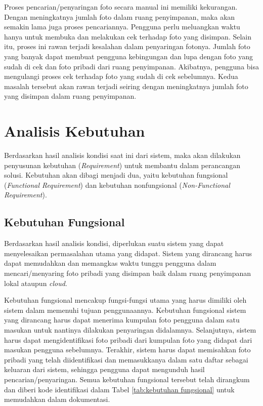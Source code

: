 Proses pencarian/penyaringan foto secara manual ini memiliki kekurangan. Dengan meningkatnya jumlah foto dalam ruang penyimpanan, maka akan semakin lama juga proses pencariannya. Pengguna perlu meluangkan waktu hanya untuk membuka dan melakukan cek terhadap foto yang disimpan. Selain itu, proses ini rawan terjadi kesalahan dalam penyaringan fotonya. Jumlah foto yang banyak dapat membuat pengguna kebingungan dan lupa dengan foto yang sudah di cek dan foto pribadi dari ruang penyimpanan. Akibatnya, pengguna bisa mengulangi proses cek terhadap foto yang sudah di cek sebelumnya. Kedua masalah tersebut akan rawan terjadi seiring dengan meningkatnya jumlah foto yang disimpan dalam ruang penyimpanan.

\section{Analisis Kebutuhan}
Berdasarkan hasil analisis kondisi saat ini dari sistem, maka akan dilakukan penyusunan kebutuhan (\textit{Requirement}) untuk membantu dalam perancangan solusi. Kebutuhan akan dibagi menjadi dua, yaitu kebutuhan fungsional (\textit{Functional Requirement}) dan kebutuhan nonfungsional (\textit{Non-Functional Requirement}).

\subsection{Kebutuhan Fungsional}



Berdasarkan hasil analisis kondisi, diperlukan suatu sistem yang dapat menyelesaikan permasalahan utama yang didapat. Sistem yang dirancang harus dapat memudahkan dan memangkas waktu tunggu pengguna dalam mencari/menyaring foto pribadi yang disimpan baik dalam ruang penyimpanan lokal ataupun \textit{cloud}. 

Kebutuhan fungsional mencakup fungsi-fungsi utama yang harus dimiliki oleh sistem dalam memenuhi tujuan penggunaannya. Kebutuhan fungsional sistem yang dirancang harus dapat menerima kumpulan foto pengguna dalam satu masukan untuk nantinya dilakukan penyaringan didalamnya. Selanjutnya, sistem harus dapat mengidentifikasi foto pribadi dari kumpulan foto yang didapat dari masukan pengguna sebelumnya. Terakhir, sistem harus dapat memisahkan foto pribadi yang telah diidentifikasi dan memasukkanya dalam satu daftar sebagai keluaran dari sistem, sehingga pengguna dapat mengunduh hasil pencarian/penyaringan. Semua kebutuhan fungsional tersebut telah dirangkum dan diberi kode identifikasi dalam Tabel \ref{tab:kebutuhan fungsional} untuk memudahkan dalam dokumentasi.

